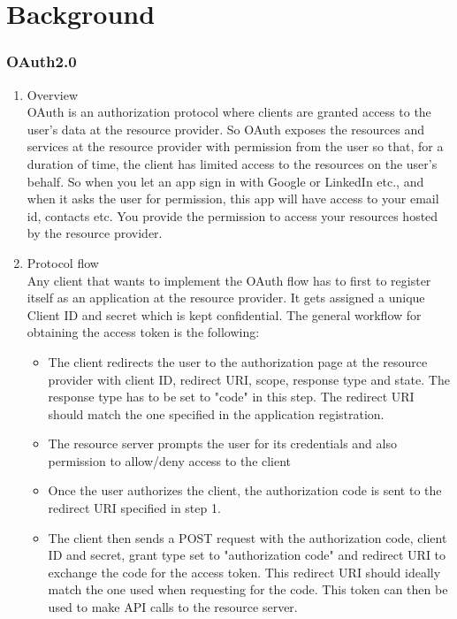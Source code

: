 \section{Background}
\label{sec:background}

\subsubsection{OAuth2.0}
\begin{enumerate}[label=(\Alph*)]
\item {Overview}\\
OAuth is an authorization protocol where clients are granted access to the user's data at the resource provider. So OAuth exposes the resources and services at the resource provider with permission from the user so that, for a duration of time, the client has limited access to the resources on the user's behalf. So when you let an app sign in with Google or LinkedIn etc., and when it asks the user for permission, this app will have access to your email id, contacts etc. You provide the permission to access your resources hosted by the resource provider.
\item {Protocol flow}\\
Any client that wants to implement the OAuth flow has to first to register itself as an application at the resource provider. It gets assigned a unique Client ID and secret which is kept confidential. The general workflow for obtaining the access token is the following:
\begin{itemize}
\item The client redirects the user to the  authorization page  at the resource provider with client ID, redirect URI, scope, response type and state. The response type has to be set to "code" in this step. The redirect URI should match the one specified in the application registration. 
\item The resource server prompts the user for its credentials and also permission to allow/deny access to the client
\item Once the user authorizes the client, the authorization code is sent to the redirect URI specified in step 1. 
\item The client then sends a POST request with the authorization code, client ID and secret, grant type set to "authorization code" and redirect URI to exchange the code for the access token. This redirect URI should ideally match the one used when requesting for the code. This token can then be used to make API calls to the resource server. 

\end{itemize}
\end{enumerate}

